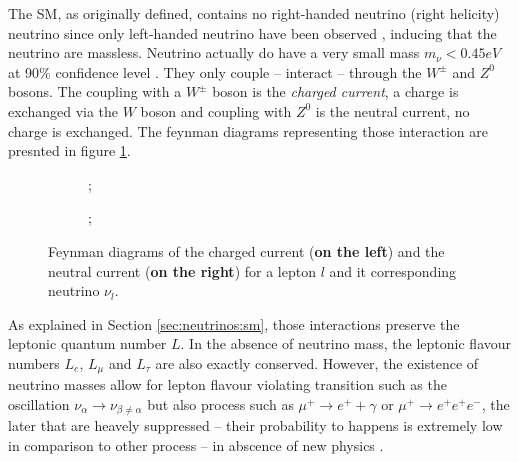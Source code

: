 The SM, as originally defined, contains no right-handed neutrino (right helicity) neutrino since only left-handed neutrino have been observed \cite{goldhaber_helicity_1958}, inducing that the neutrino are massless. Neutrino actually do have a very small mass $m_\nu < 0.45eV$ at 90\% confidence level \cite{aker_direct_2024}. They only couple -- interact -- through the $W^{\pm}$ and $Z^0$ bosons. The coupling with a $W^{\pm}$ boson is the \textit{charged current}, a charge is exchanged via the $W$ boson and coupling with $Z^0$ is the neutral current, no charge is exchanged. The feynman diagrams representing those interaction are presnted in figure \ref{fig:neutrinos:currents}.

\begin{figure}
  \centering
  \begin{subfigure}[t]{0.48\linewidth}
    \centering
    ;
  \end{subfigure}
  \hfill
  \begin{subfigure}[t]{0.48\linewidth}
    \centering
    ;
  \end{subfigure}
  \caption{Feynman diagrams of the charged current (\textbf{on the left}) and the neutral current (\textbf{on the right}) for a lepton $l$ and it corresponding neutrino $\nu_l$.}
  \label{fig:neutrinos:currents}
\end{figure}

As explained in Section \ref{sec:neutrinos:sm}, those interactions preserve the leptonic quantum number $L$. In the absence of neutrino mass, the leptonic flavour numbers $L_e$, $L_\mu$ and $L_\tau$ are also exactly conserved. However, the existence of neutrino masses allow for lepton flavour violating transition such as the oscillation $\nu_\alpha \rightarrow \nu_{\beta \neq \alpha}$ but also process such as $\mu^+ \rightarrow e^+ + \gamma$ or $\mu^+ \rightarrow e^+ e^+ e^-$, the later that are heavely suppressed -- their probability to happens is extremely low in comparison to other process -- in abscence of new physics \cite{glashow_weak_1970}.



